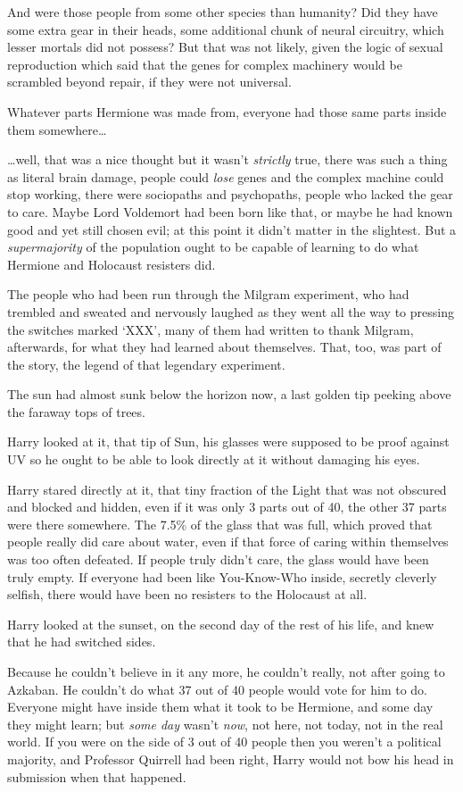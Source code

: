 And were those people from some other species than humanity? Did they have some extra gear in their heads, some additional chunk of neural circuitry, which lesser mortals did not possess? But that was not likely, given the logic of sexual reproduction which said that the genes for complex machinery would be scrambled beyond repair, if they were not universal.

Whatever parts Hermione was made from, everyone had those same parts inside them somewhere…

…well, that was a nice thought but it wasn’t \emph{strictly} true, there was such a thing as literal brain damage, people could \emph{lose} genes and the complex machine could stop working, there were sociopaths and psychopaths, people who lacked the gear to care. Maybe Lord Voldemort had been born like that, or maybe he had known good and yet still chosen evil; at this point it didn’t matter in the slightest. But a \emph{supermajority} of the population ought to be capable of learning to do what Hermione and Holocaust resisters did.

The people who had been run through the Milgram experiment, who had trembled and sweated and nervously laughed as they went all the way to pressing the switches marked ‘XXX’, many of them had written to thank Milgram, afterwards, for what they had learned about themselves. That, too, was part of the story, the legend of that legendary experiment.

The sun had almost sunk below the horizon now, a last golden tip peeking above the faraway tops of trees.

Harry looked at it, that tip of Sun, his glasses were supposed to be proof against UV so he ought to be able to look directly at it without damaging his eyes.

Harry stared directly at it, that tiny fraction of the Light that was not obscured and blocked and hidden, even if it was only 3 parts out of 40, the other 37 parts were there somewhere. The 7.5\% of the glass that was full, which proved that people really did care about water, even if that force of caring within themselves was too often defeated. If people truly didn’t care, the glass would have been truly empty. If everyone had been like You-Know-Who inside, secretly cleverly selfish, there would have been no resisters to the Holocaust at all.

Harry looked at the sunset, on the second day of the rest of his life, and knew that he had switched sides.

Because he couldn’t believe in it any more, he couldn’t really, not after going to Azkaban. He couldn’t do what 37 out of 40 people would vote for him to do. Everyone might have inside them what it took to be Hermione, and some day they might learn; but \emph{some day} wasn’t \emph{now}, not here, not today, not in the real world. If you were on the side of 3 out of 40 people then you weren’t a political majority, and Professor Quirrell had been right, Harry would not bow his head in submission when that happened.

